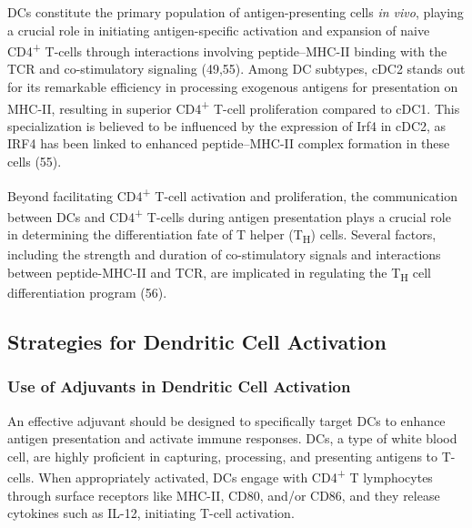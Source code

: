 \documentclass[
]{article}
\begin{document}
DCs constitute the primary population of antigen-presenting cells
\emph{in vivo}, playing a crucial role in initiating antigen-specific
activation and expansion of naive CD4\textsuperscript{+} T-cells through
interactions involving peptide--MHC-II binding with the TCR and
co-stimulatory signaling (49,55). Among DC subtypes, cDC2 stands out for
its remarkable efficiency in processing exogenous antigens for
presentation on MHC-II, resulting in superior CD4\textsuperscript{+}
T-cell proliferation compared to cDC1. This specialization is believed
to be influenced by the expression of Irf4 in cDC2, as IRF4 has been
linked to enhanced peptide--MHC-II complex formation in these cells
(55).

Beyond facilitating CD4\textsuperscript{+} T-cell activation and
proliferation, the communication between DCs and CD4\textsuperscript{+}
T-cells during antigen presentation plays a crucial role in determining
the differentiation fate of T helper (T\textsubscript{H}) cells. Several
factors, including the strength and duration of co-stimulatory signals
and interactions between peptide-MHC-II and TCR, are implicated in
regulating the T\textsubscript{H} cell differentiation program (56).

\subsection{Strategies for Dendritic Cell
Activation}\label{strategies-for-dendritic-cell-activation}

\subsubsection{Use of Adjuvants in Dendritic Cell
Activation}\label{use-of-adjuvants-in-dendritic-cell-activation}

An effective adjuvant should be designed to specifically target DCs to
enhance antigen presentation and activate immune responses. DCs, a type
of white blood cell, are highly proficient in capturing, processing, and
presenting antigens to T-cells. When appropriately activated, DCs engage
with CD4\textsuperscript{+} T lymphocytes through surface receptors like
MHC-II, CD80, and/or CD86, and they release cytokines such as IL-12,
initiating T-cell activation.
\end{document}
